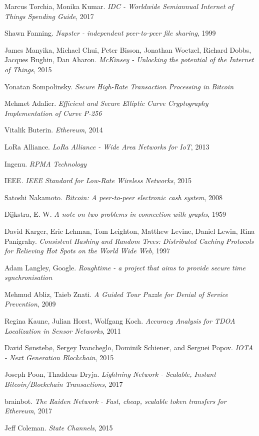 \documentclass[UTF8, 10pt, nonatbib, nocopyrightspace, reprint]{sigplanconf}
\begin{document}
\begin{thebibliography}{10}
\softraggedright

    Marcus Torchia, Monika Kumar. 
    \emph{IDC - Worldwide Semiannual Internet of Things Spending Guide}, 2017

    Shawn Fanning.
    \emph{Napster - independent peer-to-peer file sharing}, 1999

    James Manyika, Michael Chui, Peter Bisson, Jonathan Woetzel, Richard Dobbs, Jacques Bughin, Dan Aharon.
    \emph{McKinsey - Unlocking the potential of the Internet of Things}, 2015

    Yonatan Sompolinsky.
    \emph{Secure High-Rate Transaction Processing in Bitcoin}

    Mehmet Adalier.
    \emph{Efficient and Secure Elliptic Curve Cryptography Implementation of Curve P-256}

    Vitalik Buterin.
    \emph{Ethereum}, 2014

    LoRa Alliance.
    \emph{LoRa Alliance - Wide Area Networks for IoT}, 2013

    Ingenu.
    \emph{RPMA Technology}

    IEEE.
    \emph{IEEE Standard for Low-Rate Wireless Networks}, 2015

    Satoshi Nakamoto.
    \emph{Bitcoin: A peer-to-peer electronic cash system}, 2008

    Dijkstra, E. W.
    \emph{A note on two problems in connection with graphs}, 1959

    David Karger, Eric Lehman, Tom Leighton, Matthew Levine, Daniel Lewin, Rina Panigrahy.
    \emph{Consistent Hashing and Random Trees: Distributed Caching Protocols for Relieving Hot Spots on the World Wide Web}, 1997

    Adam Langley, Google.
    \emph{Roughtime - a project that aims to provide secure time synchronisation}

    Mehmud Abliz, Taieb Znati.
    \emph{A Guided Tour Puzzle for Denial of Service Prevention}, 2009

    Regina Kaune, Julian Horst, Wolfgang Koch.
    \emph{Accuracy Analysis for TDOA Localization in Sensor Networks}, 2011

    David Sønstebø, Sergey Ivancheglo, Dominik Schiener, and Serguei Popov.
    \emph{IOTA - Next Generation Blockchain}, 2015

    Joseph Poon, Thaddeus Dryja.
    \emph{Lightning Network - Scalable, Instant Bitcoin/Blockchain Transactions}, 2017

    brainbot.
    \emph{The Raiden Network - Fast, cheap, scalable token transfers for Ethereum}, 2017

    Jeff Coleman.
    \emph{State Channels}, 2015

\end{thebibliography}
\end{document}
